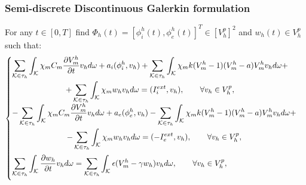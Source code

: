 \documentclass[8pt]{beamer}
\begin{document}
\begin{frame}
	\frametitle{Semi-discrete Discontinuous Galerkin formulation}
	For any $t\in[0,T]$ find $\Phi_h(t)=[\phi_i^h(t),\phi_e^h(t)]^T \in [V_h^p]^2$  and  $w_h(t) \in V_h^p$ such that:
	\vspace{2mm}
	\begin{equation*}
	\begin{cases}
	\begin{gathered}
	\sum_{\mathcal{K} \in \tau_h} \int_{\mathcal{K}}{ \chi_m C_m \pdv{V_m^h}{t} v_h d\omega}+a_i(\phi_i^h,v_h)+\sum_{\mathcal{K} \in \tau_h} \int_{\mathcal{K}}{ \chi_m k (V_m^h-1)(V_m^h-a) V_m^h v_h d\omega}+\\
	+\sum_{\mathcal{K} \in \tau_h} \int_{\mathcal{K}}{ \chi_m w_h v_h d\omega}=(I_i^{ext},v_h), \qquad \forall v_h \in V_h^p,\\
	\end{gathered}\\
	\vspace{2mm}
	\begin{gathered}
	-\sum_{\mathcal{K} \in \tau_h} \int_{\mathcal{K}}{ \chi_m C_m \pdv{V_m^h}{t} v_h d\omega}+a_e(\phi_e^h,v_h)-\sum_{\mathcal{K} \in \tau_h} \int_{\mathcal{K}}{ \chi_m k (V_m^h-1)(V_m^h-a) V_m^h v_h d\omega}+\\
	-\sum_{\mathcal{K} \in \tau_h} \int_{\mathcal{K}}{ \chi_m w_h v_h d\omega}=(-I_e^{ext},v_h), \qquad \forall v_h \in V_h^p,\\
	\end{gathered}\\
	\vspace{2mm}
	\displaystyle \sum_{\mathcal{K} \in \tau_h} \int_{\mathcal{K}}{\pdv{w_h}{t}v_h d\omega}=\sum_{\mathcal{K} \in \tau_h} \int_{\mathcal{K}}{\epsilon (V_m^h-\gamma w_h) v_h d\omega}, \qquad \forall v_h \in V_h^p,\\
	\end{cases}
	\end{equation*}
\end{frame}
\end{document}
